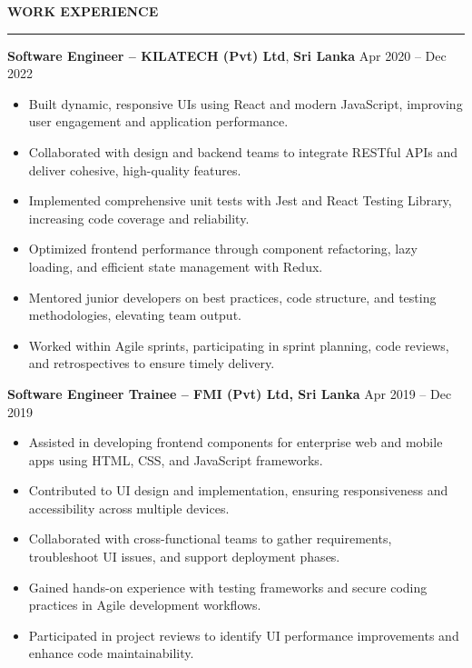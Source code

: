 \documentclass[10pt,letterpaper]{article}
\begin{document}
\vspace{8pt}

\textbf{WORK EXPERIENCE}\\[-8pt]
\noindent\rule{\textwidth}{1pt}

\vspace{-2pt}

\textbf{Software Engineer -- KILATECH (Pvt) Ltd}, \textbf{Sri Lanka} \hfill Apr 2020 -- Dec 2022

\vspace{-1pt}

\begin{itemize}
\item Built dynamic, responsive UIs using React and modern JavaScript, improving user engagement and application performance.
\item Collaborated with design and backend teams to integrate RESTful APIs and deliver cohesive, high-quality features.
\item Implemented comprehensive unit tests with Jest and React Testing Library, increasing code coverage and reliability.
\item Optimized frontend performance through component refactoring, lazy loading, and efficient state management with Redux.
\item Mentored junior developers on best practices, code structure, and testing methodologies, elevating team output.
\item Worked within Agile sprints, participating in sprint planning, code reviews, and retrospectives to ensure timely delivery.
\end{itemize}

\textbf{Software Engineer Trainee -- FMI (Pvt) Ltd, Sri Lanka} \hfill Apr 2019 -- Dec 2019

\vspace{-1pt}

\begin{itemize}
\item Assisted in developing frontend components for enterprise web and mobile apps using HTML, CSS, and JavaScript frameworks.
\item Contributed to UI design and implementation, ensuring responsiveness and accessibility across multiple devices.
\item Collaborated with cross-functional teams to gather requirements, troubleshoot UI issues, and support deployment phases.
\item Gained hands-on experience with testing frameworks and secure coding practices in Agile development workflows.
\item Participated in project reviews to identify UI performance improvements and enhance code maintainability.
\end{itemize}
\end{document}
